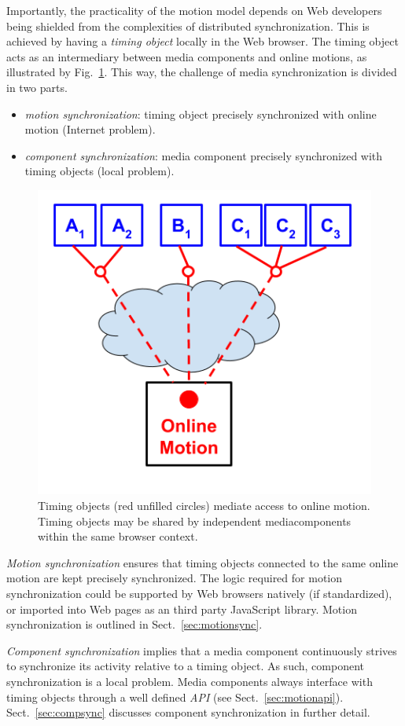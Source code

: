 Importantly, the practicality of the motion model depends on Web developers
being shielded from the complexities of distributed synchronization. This is
achieved by having a \emph{timing object} locally in the Web browser. The
timing object acts as an intermediary between media components and online
motions, as illustrated by Fig.~\ref{fig:model-2}. This way, the challenge of
media synchronization is divided in two parts.

\begin{itemize}
\item{\emph{motion synchronization}: timing object precisely synchronized with online motion (Internet problem).}
\item{\emph{component synchronization}: media component precisely synchronized with timing objects (local problem).} 
\end{itemize}


\begin{figure}[h]
\centering
\includegraphics[scale=.4]{fig/motion-model-2.png}
\caption{Timing objects (red unfilled circles) mediate access to online motion. Timing objects may be shared by independent mediacomponents within the same browser context.}
\label{fig:model-2}
\end{figure}

\emph{Motion synchronization} ensures that timing objects connected to the
same online motion are kept precisely synchronized. The logic required for
motion synchronization could be supported by Web browsers natively (if
standardized), or imported into Web pages as an third party JavaScript
library. Motion synchronization is outlined in Sect.~\ref{sec:motionsync}.

\emph{Component synchronization} implies that a media component continuously strives
to synchronize its activity relative to a timing object. As such, component
synchronization is a local problem. Media components always interface with
timing objects through a well defined \emph{API} (see Sect.~\ref{sec:motionapi}).
Sect.~\ref{sec:compsync} discusses component synchronization in
further detail.
